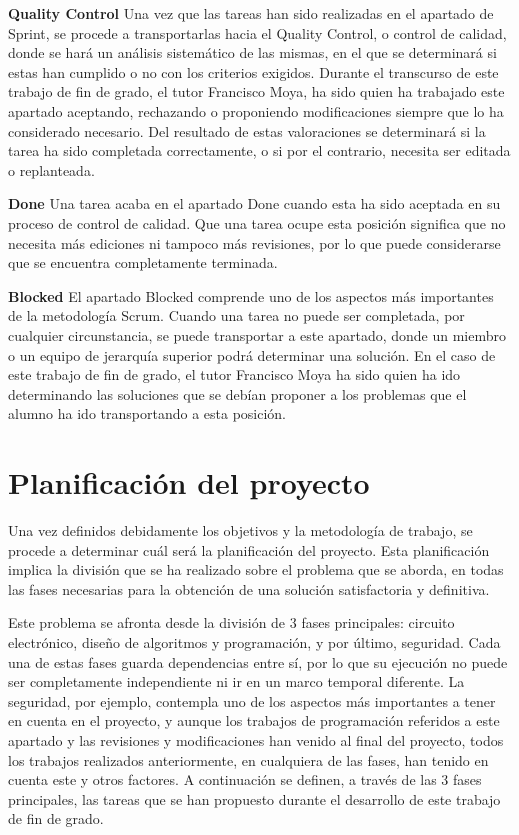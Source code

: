 \textbf{\large Quality Control}
Una vez que las tareas han sido realizadas en el apartado de Sprint, se procede a transportarlas hacia el Quality Control, o control de calidad, donde se hará un análisis sistemático de las mismas, en el que se determinará si estas han cumplido o no con los criterios exigidos. Durante el transcurso de este trabajo de fin de grado, el tutor Francisco Moya, ha sido quien ha trabajado este apartado aceptando, rechazando o proponiendo modificaciones siempre que lo ha considerado necesario. Del resultado de estas valoraciones se determinará si la tarea ha sido completada correctamente, o si por el contrario, necesita ser editada o replanteada.

\textbf{\large Done}
Una tarea acaba en el apartado Done cuando esta ha sido aceptada en su proceso de control de calidad. Que una tarea ocupe esta posición significa que no necesita más ediciones ni tampoco más revisiones, por lo que puede considerarse que se encuentra completamente terminada.

\textbf{\large Blocked}
El apartado Blocked comprende uno de los aspectos más importantes de la metodología Scrum. Cuando una tarea no puede ser completada, por cualquier circunstancia, se puede transportar a este apartado, donde un miembro o un equipo de jerarquía superior podrá determinar una solución. En el caso de este trabajo de fin de grado, el tutor Francisco Moya ha sido quien ha ido determinando las soluciones que se debían proponer a los problemas que el alumno ha ido transportando a esta posición.
\section{Planificación del proyecto} 
\label{sec:planificacion-del-proyecto}
Una vez definidos debidamente los objetivos y la metodología de trabajo, se procede a determinar cuál será la planificación del proyecto. Esta planificación implica la división que se ha realizado sobre el problema que se aborda, en todas las fases necesarias para la obtención de una solución satisfactoria y definitiva.

Este problema se afronta desde la división de 3 fases principales: circuito electrónico, diseño de algoritmos y programación, y por último, seguridad. Cada una de estas fases guarda dependencias entre sí, por lo que su ejecución no puede ser completamente independiente ni ir en un marco temporal diferente. La seguridad, por ejemplo, contempla uno de los aspectos más importantes a tener en cuenta en el proyecto, y aunque los trabajos de programación referidos a este apartado y las revisiones y modificaciones han venido al final del proyecto, todos los trabajos realizados anteriormente, en cualquiera de las fases, han tenido en cuenta este y otros factores. A continuación se definen, a través de las 3 fases principales, las tareas que se han propuesto durante el desarrollo de este trabajo de fin de grado.
